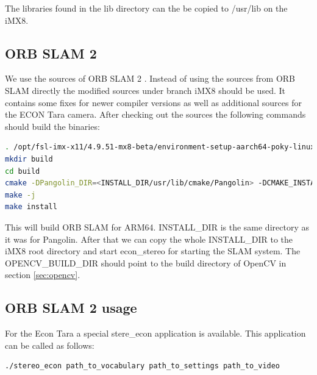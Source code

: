 \documentclass[11pt,a4paper,titlepage,oneside]{report}
\begin{document}
The libraries found in the lib directory can the be copied to /usr/lib on the iMX8.

\subsection{ORB SLAM 2}
We use the sources of ORB SLAM 2 \cite{orbslam2_impl}. Instead of using the sources from ORB SLAM directly the modified sources \cite{orbslam2_se} under branch iMX8 should be used. It contains some fixes for newer compiler versions as well as additional sources for the ECON Tara camera. After checking out the sources the following commands should build the binaries:\\
\begin{lstlisting}[language=bash]
. /opt/fsl-imx-x11/4.9.51-mx8-beta/environment-setup-aarch64-poky-linux
mkdir build
cd build
cmake -DPangolin_DIR=<INSTALL_DIR/usr/lib/cmake/Pangolin> -DCMAKE_INSTALL_PREFIX=<INSTALL_DIR> -DOpenCV_DIR:PATH=<OPENCV_BUILD_DIR> ..
make -j
make install
\end{lstlisting}

This will build ORB SLAM for ARM64. INSTALL\_DIR is the same directory as it was for Pangolin. After that we can copy the whole INSTALL\_DIR to the iMX8 root directory and start econ\_stereo for starting the SLAM system. The OPENCV\_BUILD\_DIR should point to the build directory of OpenCV in section \ref{sec:opencv}.

\subsection{ORB SLAM 2 usage}

For the Econ Tara a special stere\_econ application is available. This application can be called as follows:
\begin{lstlisting}[language=bash]
./stereo_econ path_to_vocabulary path_to_settings path_to_video
\end{lstlisting}
\end{document}

